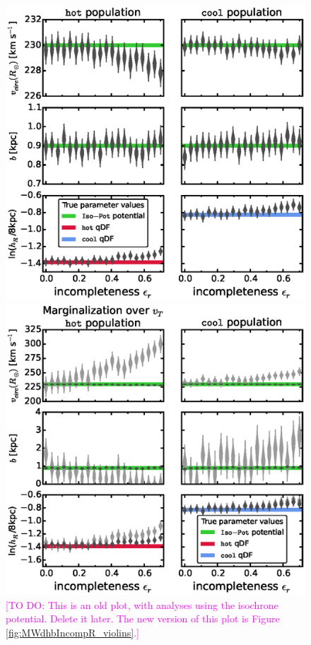 \documentclass[iop,revtex4,numberedappendix,appendixfloats]{emulateapj}
\newcommand{\Wilma}[1]{\textcolor{Magenta}{#1}}
\begin{document}
\begin{figure}[!htbp]
\centering
\begin{minipage}{0.48\textwidth}
\centering
\includegraphics[width=\columnwidth]{figs/isoSphFlexIncompR_violins_2.eps}
\caption{\Wilma{[TO DO: This is an old plot, with analyses using the isochrone potential. Delete it later. The new version of this plot is Figure \ref{fig:MWdhbIncompR_violins}.]}}
\label{fig:isoSphFlexIncompR}
\end{minipage}
\hfill
\begin{minipage}{0.48\textwidth}
\centering
\includegraphics[width=\columnwidth]{figs/isoSphFlexIncompR_marginal_violins_3.eps}

\end{minipage}
\end{figure}
\end{document}
